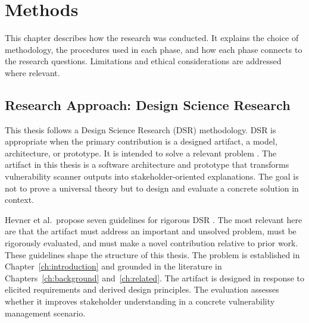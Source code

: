\chapter{Methods}%
\label{ch:methods}

This chapter describes how the research was conducted. It explains the choice of methodology, the procedures used in each phase, and how each phase connects to the research questions. Limitations and ethical considerations are addressed where relevant.

\section{Research Approach: Design Science Research}

This thesis follows a Design Science Research (DSR) methodology. DSR is appropriate when the primary contribution is a designed artifact, a model, architecture, or prototype. It is intended to solve a relevant problem \cite{hevner2004dsr}. The artifact in this thesis is a software architecture and prototype that transforms vulnerability scanner outputs into stakeholder-oriented explanations. The goal is not to prove a universal theory but to design and evaluate a concrete solution in context.

Hevner et al.\ propose seven guidelines for rigorous DSR \cite{hevner2004dsr}. The most relevant here are that the artifact must address an important and unsolved problem, must be rigorously evaluated, and must make a novel contribution relative to prior work. These guidelines shape the structure of this thesis. The problem is established in Chapter~\ref{ch:introduction} and grounded in the literature in Chapters~\ref{ch:background} and~\ref{ch:related}. The artifact is designed in response to elicited requirements and derived design principles. The evaluation assesses whether it improves stakeholder understanding in a concrete vulnerability management scenario.

